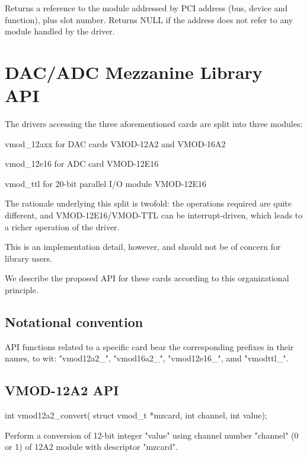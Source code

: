 \documentclass[11pt,a4paper]{article}
\begin{document}
Returns a reference to the module addressed by PCI address (bus, device
and function), plus slot number. Returns NULL if the address does not
refer to any module handled by the driver.

\section{DAC/ADC Mezzanine Library API}
\label{library:API}

The drivers accessing the three aforementioned cards are split into
three modules: 
\begin{compactdesc}
   \item[vmod\_12axx] for DAC cards VMOD-12A2 and VMOD-16A2
   \item[vmod\_12e16] for ADC card VMOD-12E16
   \item[vmod\_ttl] for 20-bit parallel I/O module VMOD-12E16
\end{compactdesc}
The rationale underlying this split is twofold: the operations required
are quite different, and VMOD-12E16/VMOD-TTL can be interrupt-driven, which 
leads to a richer operation of the driver.

This is an implementation detail, however, and should not be 
of concern for library users.

We describe the proposed API for these cards according to this 
organizational principle. 

\subsection*{Notational convention}

API functions related to a specific card bear the corresponding
prefixes in their names, to wit: 
"vmod12a2_", 
"vmod16a2_",
"vmod12e16_", amd
"vmodttl_". 

\subsection{VMOD-12A2 API}

\begin{proto}
int vmod12a2_convert(
	struct vmod_t *mzcard, int channel,
	int value);
\end{proto}

Perform a conversion of 12-bit integer "value" using channel 
number "channel" (0 or 1) of 12A2 module with descriptor "mzcard". 
\end{document}
